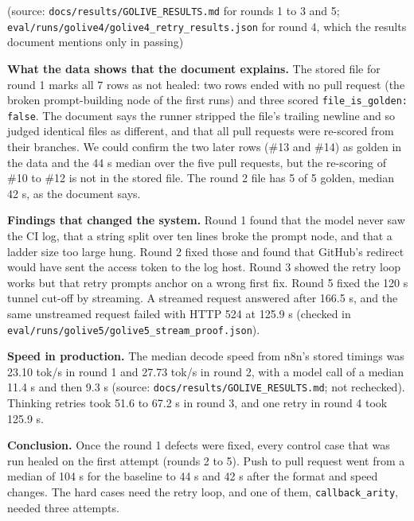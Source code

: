 (source: \texttt{docs/\allowbreak{}results/\allowbreak{}GOLIVE\_\allowbreak{}RESULTS.\allowbreak{}md} for rounds 1 to 3 and 5; \texttt{eval/\allowbreak{}runs/\allowbreak{}golive4/\allowbreak{}golive4\_\allowbreak{}retry\_\allowbreak{}results.\allowbreak{}json} for round 4, which the results document mentions only in passing)

\textbf{What the data shows that the document explains.} The stored file for round 1 marks all 7 rows as not healed: two rows ended with no pull request (the broken prompt-building node of the first runs) and three scored \texttt{file\_\allowbreak{}is\_\allowbreak{}golden:\allowbreak{} false}. The document says the runner stripped the file's trailing newline and so judged identical files as different, and that all pull requests were re-scored from their branches. We could confirm the two later rows (\#13 and \#14) as golden in the data and the 44 s median over the five pull requests, but the re-scoring of \#10 to \#12 is not in the stored file. The round 2 file has 5 of 5 golden, median 42 s, as the document says.

\textbf{Findings that changed the system.} Round 1 found that the model never saw the CI log, that a string split over ten lines broke the prompt node, and that a ladder size too large hung. Round 2 fixed those and found that GitHub's redirect would have sent the access token to the log host. Round 3 showed the retry loop works but that retry prompts anchor on a wrong first fix. Round 5 fixed the 120 s tunnel cut-off by streaming. A streamed request answered after 166.5 s, and the same unstreamed request failed with HTTP 524 at 125.9 s (checked in \texttt{eval/\allowbreak{}runs/\allowbreak{}golive5/\allowbreak{}golive5\_\allowbreak{}stream\_\allowbreak{}proof.\allowbreak{}json}).

\textbf{Speed in production.} The median decode speed from n8n's stored timings was 23.10 tok/\allowbreak{}s in round 1 and 27.73 tok/\allowbreak{}s in round 2, with a model call of a median 11.4 s and then 9.3 s (source: \texttt{docs/\allowbreak{}results/\allowbreak{}GOLIVE\_\allowbreak{}RESULTS.\allowbreak{}md}; not rechecked). Thinking retries took 51.6 to 67.2 s in round 3, and one retry in round 4 took 125.9 s.

\textbf{Conclusion.} Once the round 1 defects were fixed, every control case that was run healed on the first attempt (rounds 2 to 5). Push to pull request went from a median of 104 s for the baseline to 44 s and 42 s after the format and speed changes. The hard cases need the retry loop, and one of them, \texttt{callback\_\allowbreak{}arity}, needed three attempts.

